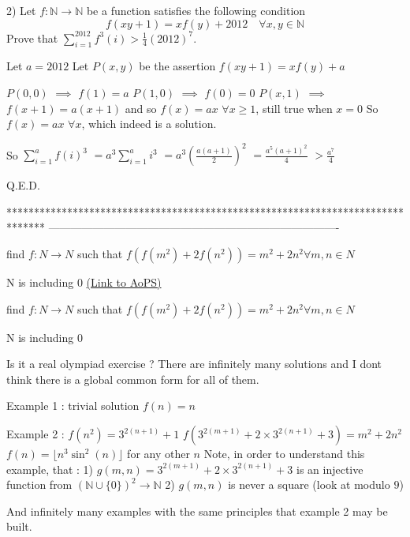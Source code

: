 \begin{solution}
	\begin{tcolorbox}2)   Let $f:\mathbb{N}\rightarrow \mathbb{N}$ be a function satisfies the following condition
 \[f\left ( xy+1 \right )=xf\left ( y \right )+2012\quad \forall x,y\in \mathbb{N}\]
Prove that $\sum_{i=1}^{2012}f^{3}\left ( i \right )>\frac{1}{4}\left ( 2012 \right )^{7}$.\end{tcolorbox}
Let $a=2012$
Let $P(x,y)$ be the assertion $f(xy+1)=xf(y)+a$

$P(0,0)$ $\implies$ $f(1)=a$
$P(1,0)$ $\implies$ $f(0)=0$
$P(x,1)$ $\implies$ $f(x+1)=a(x+1)$ and so $f(x)=ax$ $\forall x\ge 1$, still true when $x=0$
So $f(x)=ax$ $\forall x$, which indeed is a solution.

So $\sum_{i=1}^af(i)^3$ $=a^3\sum_{i=1}^ai^3$ $=a^3\left(\frac{a(a+1)}2\right)^2$ $=\frac{a^5(a+1)^2}4$ $>\frac{a^7}4$

Q.E.D.
\end{solution}
*******************************************************************************
-------------------------------------------------------------------------------

\begin{problem}
	find $f:N \to N$ such that $f(f(m^2)+2f(n^2))=m^2+2n^2 \forall m,n \in N$

N is including 0
	\flushright \href{https://artofproblemsolving.com/community/c6h564346}{(Link to AoPS)}
\end{problem}



\begin{solution}
	\begin{tcolorbox}find $f:N \to N$ such that $f(f(m^2)+2f(n^2))=m^2+2n^2 \forall m,n \in N$

N is including 0\end{tcolorbox}
Is it a real olympiad exercise ?
There are infinitely many solutions and I dont think there is a global common form for all of them.

Example 1 : trivial solution $f(n)=n$

Example 2 :
$f(n^2)=3^{2(n+1)}+1$
$f(3^{2(m+1)}+2\times 3^{2(n+1)}+3)=m^2+2n^2$
$f(n)=\lfloor n^3\sin^2(n)\rfloor$ for any other $n$
Note, in order to understand this example, that :
1) $g(m,n)=3^{2(m+1)}+2\times 3^{2(n+1)}+3$ is an injective function from $(\mathbb N\cup\{0\})^2\to\mathbb N$
2) $g(m,n)$ is never a square (look at modulo $9$)

And infinitely many examples with the same principles that example 2 may be built.
\end{solution}



